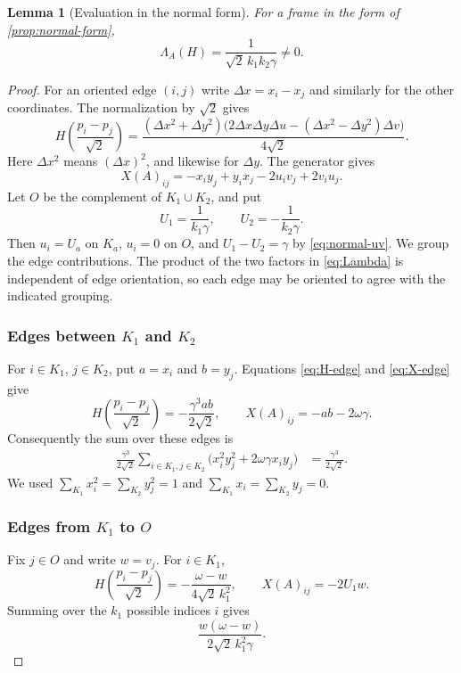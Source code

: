 \documentclass[11pt,reqno]{amsart}
\newtheorem{lemma}[lemma]{Lemma}
\theoremstyle{definition}
\theoremstyle{remark}
\numberwithin{equation}{section}
\begin{document}
\begin{lemma}[Evaluation in the normal form]\label{lem:normal-evaluation}
For a frame in the form of \cref{prop:normal-form},
\begin{equation}\label{eq:nonzero-obstruction}
 \Lambda_A(H)=\frac1{\sqrt2\,k_1k_2\gamma}\ne0.
\end{equation}
\end{lemma}
\begin{proof}
For an oriented edge $(i,j)$ write
$\Delta x=x_i-x_j$ and similarly for the other coordinates.
The normalization by $\sqrt2$ gives
\begin{equation}\label{eq:H-edge}
 H\!\left(\frac{p_i-p_j}{\sqrt2}\right)
 =\frac{(\Delta x^2+\Delta y^2)
     \bigl(2\Delta x\Delta y\Delta u
        -(\Delta x^2-\Delta y^2)\Delta v\bigr)}{4\sqrt2}.
\end{equation}
Here $\Delta x^2$ means $(\Delta x)^2$, and likewise for $\Delta y$.
The generator gives
\begin{equation}\label{eq:X-edge}
 X(A)_{ij}=-x_i y_j+y_i x_j-2u_i v_j+2v_i u_j.
\end{equation}
Let $O$ be the complement of $K_1\cup K_2$, and put
\[
 U_1=\frac1{k_1\gamma},\qquad
 U_2=-\frac1{k_2\gamma}.
\]
Then $u_i=U_a$ on $K_a$, $u_i=0$ on $O$, and
$U_1-U_2=\gamma$ by \eqref{eq:normal-uv}.
We group the edge contributions. The product of the two factors
in \eqref{eq:Lambda} is independent of edge orientation, so each
edge may be oriented to agree with the indicated grouping.

\subsubsection*{Edges between $K_1$ and $K_2$}
For $i\in K_1$, $j\in K_2$, put $a=x_i$ and $b=y_j$.
Equations \eqref{eq:H-edge} and \eqref{eq:X-edge} give
\[
 H\!\left(\frac{p_i-p_j}{\sqrt2}\right)
    =-\frac{\gamma^3ab}{2\sqrt2},\qquad
 X(A)_{ij}=-ab-2\omega\gamma.
\]
Consequently the sum over these edges is
\begin{align}
 \frac{\gamma^3}{2\sqrt2}
 \sum_{i\in K_1,j\in K_2}
       \bigl(x_i^2y_j^2+2\omega\gamma x_i y_j\bigr)
 &=\frac{\gamma^3}{2\sqrt2}.
 \label{eq:cross-sum}
\end{align}
We used $\sum_{K_1}x_i^2=\sum_{K_2}y_j^2=1$ and
$\sum_{K_1}x_i=\sum_{K_2}y_j=0$.

\subsubsection*{Edges from $K_1$ to $O$}
Fix $j\in O$ and write $w=v_j$. For $i\in K_1$,
\[
 H\!\left(\frac{p_i-p_j}{\sqrt2}\right)
       =-\frac{\omega-w}{4\sqrt2\,k_1^2},\qquad
 X(A)_{ij}=-2U_1w.
\]
Summing over the $k_1$ possible indices $i$ gives
\begin{equation}\label{eq:K1O}
 \frac{w(\omega-w)}{2\sqrt2\,k_1^2\gamma}.
\end{equation}


\end{proof}
\end{document}
